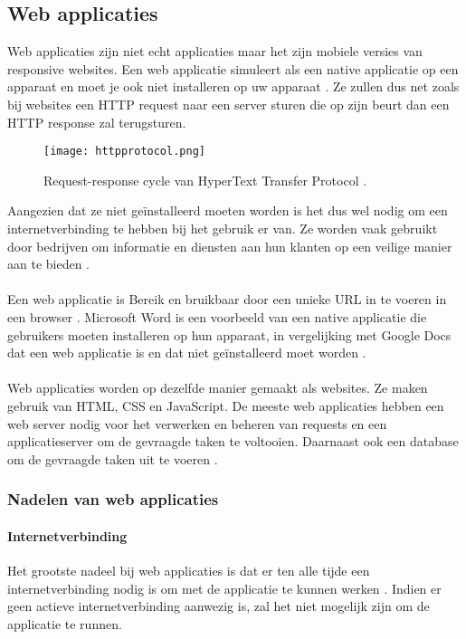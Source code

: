 \subsection{Web applicaties}
Web applicaties zijn niet echt applicaties maar het zijn mobiele versies van responsive websites. 
Een web applicatie simuleert als een native applicatie op een apparaat en moet je ook niet installeren 
op uw apparaat \autocite{Beeproger2023}. Ze zullen dus net zoals bij websites een HTTP request naar 
een server sturen die op zijn beurt dan een HTTP response zal terugsturen.
\begin{figure}[H]
    \centering
    \texttt{[image: httpprotocol.png]}
    \caption{Request-response cycle van HyperText Transfer Protocol \parencite{Hartl2019}.}
\end{figure}

Aangezien dat ze niet geïnstalleerd moeten worden is het dus wel nodig om een internetverbinding 
te hebben bij het gebruik er van. Ze worden vaak gebruikt door bedrijven om informatie en diensten 
aan hun klanten op een veilige manier aan te bieden \autocite{Nehra2023}. 
\\\\
Een web applicatie is Bereik en bruikbaar door een unieke URL in te voeren in een browser 
\autocite{Beeproger2023}. Microsoft Word is een voorbeeld van een native applicatie die 
gebruikers moeten installeren op hun apparaat, in vergelijking met Google Docs dat een web applicatie 
is en dat niet geïnstalleerd moet worden \autocite{Nehra2023}.
\\\\
Web applicaties worden op dezelfde manier gemaakt als websites. Ze maken gebruik van HTML, CSS en JavaScript. 
De meeste web applicaties hebben een web server nodig voor het verwerken en beheren van requests en een 
applicatieserver om de gevraagde taken te voltooien. Daarnaast ook een database om de gevraagde taken uit 
te voeren \autocite{Varsha2023}.

\subsubsection{Nadelen van web applicaties}
\paragraph{Internetverbinding}
Het grootste nadeel bij web applicaties is dat er ten alle tijde een internetverbinding nodig is om met 
de applicatie te kunnen werken \autocite{Varsha2023}. Indien er geen actieve internetverbinding aanwezig is, 
zal het niet mogelijk zijn om de applicatie te runnen.

